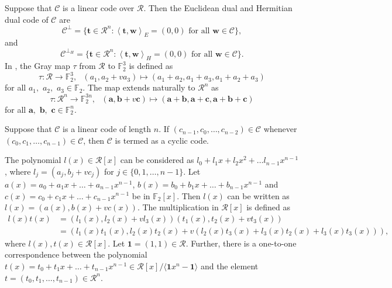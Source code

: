 \documentclass[pdflatex,sn-mathphys-num]{sn-jnl}%
\theoremstyle{thmstyleone}%
\theoremstyle{thmstyletwo}%
\theoremstyle{thmstylethree}%
\begin{document}
\noindent Suppose that $\mathcal{C}$ is a linear code over $\mathcal{R}$.
Then the Euclidean dual and Hermitian dual code of $\mathcal{C}$ are
\begin{equation*}
\mathcal{C}^{\perp }=\{\mathbf{t}\in \mathcal{R}^{n}:\left\langle \mathbf{t},
\mathbf{w}\right\rangle _{E}=(0,0)\text{ for all }\mathbf{w}\in \mathcal{C}%
\},
\end{equation*}
and
\begin{equation*}
\mathcal{C}^{\perp _{H}}=\{\mathbf{t}\in \mathcal{R}^{n}:\left\langle
\mathbf{t},\mathbf{w}\right\rangle _{H}=(0,0)\text{ for all }\mathbf{w}\in
\mathcal{C}\}.
\end{equation*}
\noindent In \cite{F2ring}, the Gray map $\tau $ from $\mathcal{R}$ to $\mathbb{F}_{2}^{3}$ is defined as
\begin{equation*}
\tau :\mathcal{R}\rightarrow \mathbb{F}_{2}^{3},\text{ \ }
(a_{1},a_{2}+va_{3})\mapsto (a_{1}+a_{2},a_{1}+a_{3},a_{1}+a_{2}+a_{3})
\end{equation*}
for all $a_{1},$ $a_{2},$ $a_{3}\in \mathbb{F}_{2}$. The map extends
naturally to $\mathcal{R}^{n}$ as
\begin{equation*}
\tau :\mathcal{R}^{n}\rightarrow \mathbb{F}_{2}^{3n},\text{ \ }(\mathbf{a},
\mathbf{b}+v\mathbf{c})\mapsto (\mathbf{a+b},\mathbf{a+c},\mathbf{a+b}+
\mathbf{c})
\end{equation*}
for all $\mathbf{a},$ $\mathbf{b},$ $\mathbf{c}\in \mathbb{F}_{2}^{n}$.


Suppose that $\mathcal{C}$ is a linear code of length $n$. If $(c_{n-1}, c_0,\dots , c_{n-2})\in \mathcal{C}$ whenever $(c_0, c_1,\dots, c_{n-1})\in \mathcal{C}$, then $\mathcal{C}$ is termed as a cyclic code.


\noindent The polynomial $l(x)\in\mathcal{R}[x]$ can be considered as $l_0+l_1x+l_2x^2+\dots l_{n-1}x^{n-1}$, where $l_j=(a_j,b_j+vc_j)$ for $j\in\{0,1,\dots ,n-1\}$. Let $a(x)=a_0+a_1x+\dots +a_{n-1}x^{n-1}$, $b(x)=b_0+b_1x+\dots +b_{n-1}x^{n-1}$ and $c(x)=c_0+c_1x+\dots +c_{n-1}x^{n-1}$ be in $\mathbb{F}_2[x]$. Then $l(x)$ can be written as $l(x)=(a(x),b(x)+vc(x))$. The multiplication in $\mathcal{R}[x]$ is defined as
\begin{align*}
l(x)t(x) & = (l_1(x),l_2(x)+vl_3(x))(t_1(x),t_2(x)+vt_3(x)) \\
 & = (l_1(x)t_1(x),l_2(x)t_2(x)+v(l_2(x)t_3(x)+l_3(x)t_2(x)+ l_3(x)t_3(x) )),
\end{align*}
where $l(x), t(x)\in \mathcal{R}[x]$.
Let $\mathbf{1}=(1,1)\in\mathcal{R}$. Further, there is a one-to-one correspondence between the polynomial $t(x)=t_0+t_1x+\dots +t_{n-1}x^{n-1}\in \mathcal{R}[x]/\langle \mathbf{1}x^{n}-\mathbf{1} \rangle$ and the element $t=(t_0,t_1,\dots ,t_{n-1})\in\mathcal{R}^n$.
\end{document}
